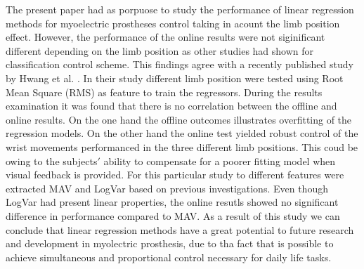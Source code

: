 The present paper had as porpuose to study the performance of linear regression methods for myoelectric prostheses control taking in acount the limb position effect. However, the performance of the online results were not siginificant different depending on the limb position as other studies had shown for classification control scheme. This findings agree with a recently published study by Hwang et al. \cite{Hwang2017}. In their study different limb position were tested using Root Mean Square (RMS) as feature to train the regressors.
During the results examination it was found that there is no correlation between the offline and online results. On the one hand the offline outcomes illustrates overfitting of the regression models. On the other hand the online test yielded robust control of the wrist movements performanced in the three different limb positions. This coud be owing to the subjects$'$ ability to compensate for a poorer fitting model when visual feedback is provided.
For this particular study to different features were extracted MAV and LogVar based on previous investigations. Even though LogVar had present linear properties, the online resutls showed no significant difference in performance compared to MAV. 
As a result of this study we can conclude that linear regression methods have a great potential to future research and development in myolectric prosthesis, due to tha fact that is possible to achieve simultaneous and proportional control necessary for daily life tasks. 
		
	


